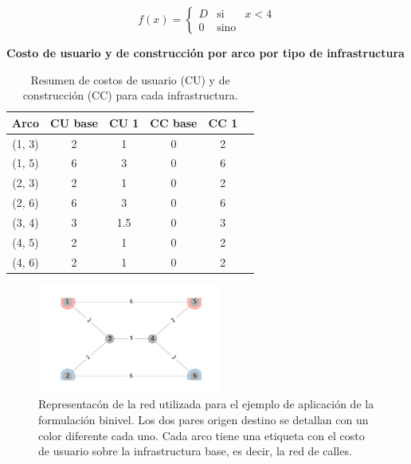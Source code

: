 \documentclass{article}
\begin{document}
  $$
    f(x) = \left\{ \begin{array}{lcr}
            D & \mbox{si}   & x < 4 \\
            0 & \mbox{sino} &
    \end{array}
    \right.
  $$

  \begin{table}[h!]
    \centering
      \caption*{{\bf Costo de usuario y de construcción por arco por tipo de infrastructura}}
    \begin{tabular}{cccccc}
      \toprule
      Arco & CU base & CU 1 & CC base & CC 1 & \\
      \midrule
        (1, 3) & 2 & 1   & 0 & 2 \\
        (1, 5) & 6 & 3   & 0 & 6 \\
        (2, 3) & 2 & 1   & 0 & 2 \\
        (2, 6) & 6 & 3   & 0 & 6 \\
        (3, 4) & 3 & 1.5 & 0 & 3 \\
        (4, 5) & 2 & 1   & 0 & 2 \\
        (4, 6) & 2 & 1   & 0 & 2 \\
      \bottomrule
    \end{tabular}
      \caption{Resumen de costos de usuario (CU) y de construcción (CC) para cada infrastructura.}\label{table:example1arccosts}
  \end{table}

  \begin{figure}[h!]
    \centering
    \includegraphics[width=6cm]{../resources/example_1_base.png}
    \caption{Representacón de la red utilizada para el ejemplo de aplicación de la formulación binivel. Los dos pares origen destino se detallan con un color diferente cada uno. Cada arco tiene una etiqueta con el costo de usuario sobre la infrastructura base, es decir, la red de calles.}
    \label{fig:example1base}
  \end{figure}
\end{document}
